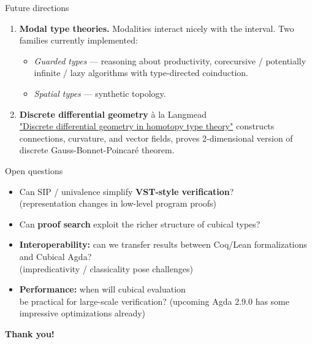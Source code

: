 \documentclass[aspectratio=169,12pt]{beamer}
\begin{document}
\begin{frame}{Future directions}
  \begin{enumerate}
    \item[\textbf{1.}] \textbf{Modal type theories.}
      Modalities interact nicely with the interval. Two families
      currently implemented:
      \begin{itemize}
        \item \emph{Guarded types} --- reasoning about productivity,
              corecursive / potentially infinite / lazy algorithms
              with type-directed coinduction.
        \item \emph{Spatial types} --- synthetic topology.
      \end{itemize}
    \pause\medskip
    \item[\textbf{2.}] \textbf{Discrete differential geometry} \`a la Langmead
      \\ {\small
      \href{https://greg.langmead.info/writing/differential_geometry_in_hott/}%
           {"Discrete differential geometry in homotopy type theory"}}
      constructs connections, curvature, and vector fields, proves 2-dimensional version of discrete Gauss-Bonnet-Poincaré theorem.
  \end{enumerate}
\end{frame}

\begin{frame}{Open questions}
  \begin{itemize}
    \item Can SIP / univalence simplify \textbf{VST-style verification}? \\
          {\small (representation changes in low-level program proofs)}
    \pause\medskip
    \item Can \textbf{proof search} exploit the richer structure of cubical types?
    \pause\medskip
    \item \textbf{Interoperability:} can we transfer results between Coq/Lean formalizations and Cubical Agda? \\
    {\small (impredicativity / classicality pose challenges)}
    \pause\medskip
    \item \textbf{Performance:} when will cubical evaluation \\
          be practical for large-scale verification?
          (upcoming Agda 2.9.0 has some impressive optimizations already)
  \end{itemize}
  \pause\bigskip
  \begin{center}
    {\Huge\bfseries Thank you!}
  \end{center}
\end{frame}
\end{document}
